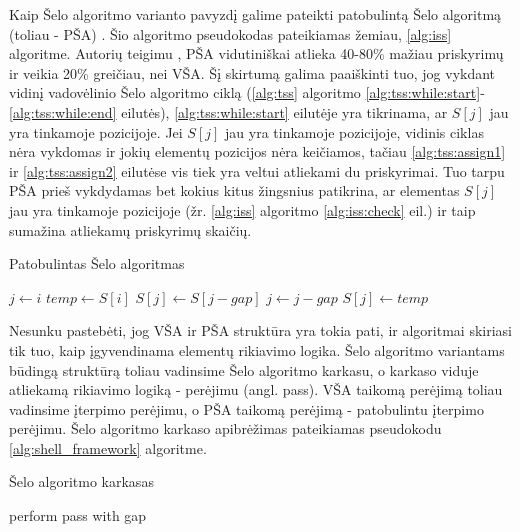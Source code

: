 \documentclass{VUMIFInfKursinis}
\begin{document}
Kaip Šelo algoritmo varianto pavyzdį galime pateikti patobulintą Šelo algoritmą (toliau - PŠA) \cite{Radavičius_Baranauskas_2013}.
Šio algoritmo pseudokodas pateikiamas žemiau, \ref{alg:iss} algoritme.
Autorių teigimu \cite{Radavičius_Baranauskas_2013}, PŠA vidutiniškai atlieka 40-80\% mažiau priskyrimų ir veikia 20\% greičiau, nei VŠA.
Šį skirtumą galima paaiškinti tuo, jog vykdant vidinį vadovėlinio Šelo algoritmo ciklą (\ref{alg:tss} algoritmo \ref{alg:tss:while:start}-\ref{alg:tss:while:end} eilutės),
\ref{alg:tss:while:start} eilutėje yra tikrinama, ar $S[j]$ jau yra tinkamoje pozicijoje.
Jei $S[j]$ jau yra tinkamoje pozicijoje, vidinis ciklas nėra vykdomas ir jokių elementų pozicijos nėra keičiamos,
tačiau \ref{alg:tss:assign1} ir \ref{alg:tss:assign2} eilutėse vis tiek yra veltui atliekami du priskyrimai.
Tuo tarpu PŠA prieš vykdydamas bet kokius kitus žingsnius patikrina, ar elementas $S[j]$ jau yra tinkamoje pozicijoje
(žr. \ref{alg:iss} algoritmo \ref{alg:iss:check} eil.) ir taip sumažina atliekamų priskyrimų skaičių.

\begin{algorithm}[H]
  \caption{Patobulintas Šelo algoritmas}\label{alg:iss}
  \begin{algorithmic}[1]
        \label{alg:iss:check}
          \State $j\gets i$\label{alg:iss:inner:start}
          \State $temp\gets S[i]$
          \Repeat\label{alg:iss:loop:start}
            \State $S[j]\gets S[j - gap]$
            \State $j\gets j-gap$
          \label{alg:iss:loop:end}
          \State $S[j]\gets temp$\label{alg:iss:inner:end}
        \EndIf
      \EndFor
    \EndFor
  \end{algorithmic}
\end{algorithm}

Nesunku pastebėti, jog VŠA ir PŠA struktūra yra tokia pati, ir algoritmai skiriasi tik tuo,
kaip įgyvendinama elementų rikiavimo logika.
Šelo algoritmo variantams būdingą struktūrą toliau vadinsime Šelo algoritmo karkasu,
o karkaso viduje atliekamą rikiavimo logiką - perėjimu (angl. pass).
VŠA taikomą perėjimą toliau vadinsime įterpimo perėjimu,
o PŠA taikomą perėjimą - patobulintu įterpimo perėjimu.
Šelo algoritmo karkaso apibrėžimas pateikiamas pseudokodu \ref{alg:shell_framework} algoritme.

\begin{algorithm}[H]
  \caption{Šelo algoritmo karkasas}\label{alg:shell_framework}
  \begin{algorithmic}[1]
        \State perform pass with gap
    \EndFor
  \end{algorithmic}
\end{algorithm}
\end{document}
